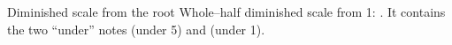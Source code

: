 \begin{patternbox}{Diminished scale from the root}{}
Whole--half diminished scale from 1:
.
It contains the two ``under'' notes  (under 5) and  (under 1).
\patternwhereline
\end{patternbox}
